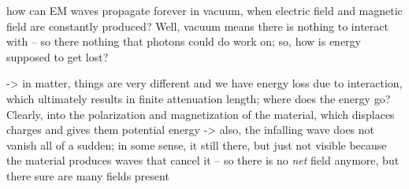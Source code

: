 \documentclass[../class_mech_main.tex]{subfiles}
\begin{document}
how can EM waves propagate forever in vacuum, when electric field and magnetic field are constantly produced? Well, vacuum means there is nothing to interact with -- so there nothing that photons could do work on; so, how is energy supposed to get lost?


-> in matter, things are very different and we have energy loss due to interaction, which ultimately results in finite attenuation length; where does the energy go? Clearly, into the polarization and magnetization of the material, which displaces charges and gives them potential energy  -> also, the infalling wave does not vanish all of a sudden; in some sense, it still there, but just not visible because the material produces waves that cancel it -- so there is no \emph{net} field anymore, but there sure are many fields present
\end{document}
